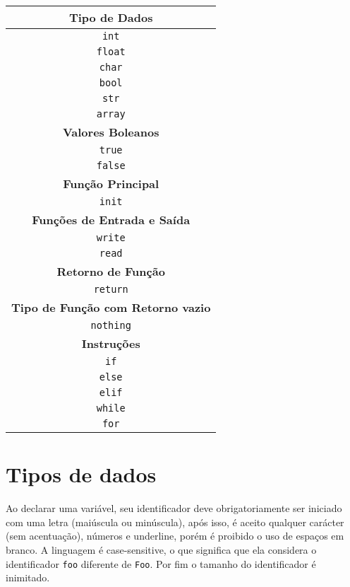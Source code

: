 \documentclass[a4paper,12pt]{article}
\begin{document}
\begin{center}
    \begin{tabular}{|c|}
         \hline
         \textbf{Tipo de Dados}\\
         \hline
         \texttt{int}\\
         \hline
         \texttt{float}\\
         \hline
         \texttt{char}\\
         \hline
         \texttt{bool}\\
         \hline
         \texttt{str}\\
         \hline
         \texttt{array}\\
         \hline
         \textbf{Valores Boleanos}\\
         \hline
         \texttt{true}\\
         \hline
         \texttt{false}\\
         \hline
         \textbf{Função Principal}\\
         \hline
         \texttt{init}\\
         \hline
         \textbf{Funções de Entrada e Saída}\\
         \hline
         \texttt{write}\\
         \hline
         \texttt{read}\\
         \hline
         \textbf{Retorno de Função}\\
         \hline
         \texttt{return}\\
         \hline
         \textbf{Tipo de Função com Retorno vazio}\\
         \hline
         \texttt{nothing}\\
         \hline
         \textbf{Instruções}\\
         \hline
         \texttt{if}\\
         \hline
         \texttt{else}\\
         \hline
         \texttt{elif}\\
         \hline
         \texttt{while}\\
         \hline
         \texttt{for}\\
         \hline
    \end{tabular}
\end{center}

\section{Tipos de dados}
Ao declarar uma variável, seu identificador deve obrigatoriamente ser iniciado com uma letra
(maiúscula ou minúscula), após isso, é aceito qualquer carácter (sem acentuação), números e
underline, porém é proibido o uso de espaços em branco. A linguagem é case-sensitive, o que
significa que ela considera o identificador \texttt{foo} diferente de \texttt{Foo}. Por fim o
tamanho do identificador é inimitado.
\end{document}
